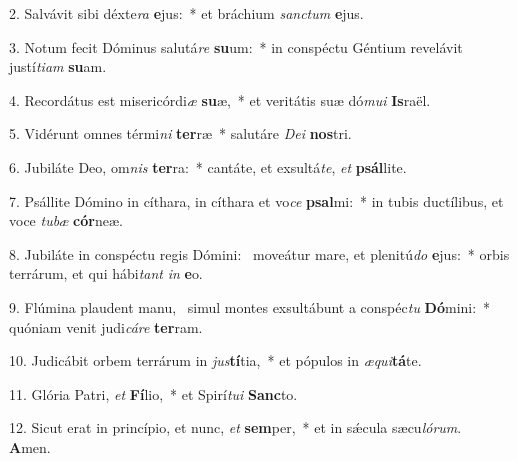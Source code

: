 2. Salvávit sibi déxte\textit{ra} \textbf{e}jus:~*  et bráchium \textit{sanc}\textit{tum} \textbf{e}jus.\

3. Notum fecit Dóminus salutá\textit{re} \textbf{su}um:~*  in conspéctu Géntium revelávit justí\textit{ti}\textit{am} \textbf{su}am.\

4. Recordátus est misericórdi\textit{æ} \textbf{su}æ,~*  et veritátis suæ dó\textit{mu}\textit{i} \textbf{Is}raël.\

5. Vidérunt omnes térmi\textit{ni} \textbf{ter}ræ~*  salutáre \textit{De}\textit{i} \textbf{nos}tri.\

6. Jubiláte Deo, om\textit{nis} \textbf{ter}ra:~*  cantáte, et exsultá\textit{te}, \textit{et} \textbf{psál}lite.\

7. Psállite Dómino in cíthara, in cíthara et vo\textit{ce} \textbf{psal}mi:~*  in tubis ductílibus, et voce \textit{tu}\textit{bæ} \textbf{cór}neæ.\

8. Jubiláte in conspéctu regis Dómini: \dag\  moveátur mare, et plenitú\textit{do} \textbf{e}jus:~*  orbis terrárum, et qui hábi\textit{tant} \textit{in} \textbf{e}o.\

9. Flúmina plaudent manu, \dag\  simul montes exsultábunt a conspéc\textit{tu} \textbf{Dó}mini:~*  quóniam venit judi\textit{cá}\textit{re} \textbf{ter}ram.\

10. Judicábit orbem terrárum in \textit{jus}\textbf{tí}tia,~*  et pópulos in \textit{æ}\textit{qui}\textbf{tá}te.\

11. Glória Patri, \textit{et} \textbf{Fí}lio,~*  et Spirí\textit{tu}\textit{i} \textbf{Sanc}to.\

12. Sicut erat in princípio, et nunc, \textit{et} \textbf{sem}per,~*  et in sǽcula sæcu\textit{ló}\textit{rum}. \textbf{A}men.\

